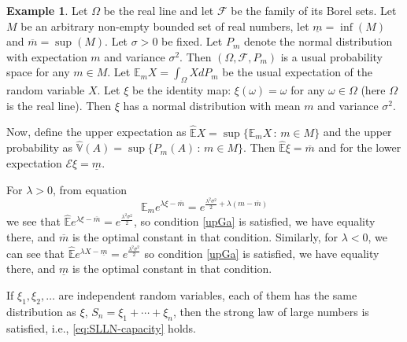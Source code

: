 \documentclass[12pt]{article}
\theoremstyle{definition}
\newtheorem{example}[theorem]{Example}
\theoremstyle{remark}
\numberwithin{equation}{section}
\def\E{{\mathbb {E}}}                       \def\D{{\mathbb {D}}}
\def\Eh{{\hat{\mathbb{E}}}}
\def\Vh{{\hat{\mathbb{V}}}}
\def\FD{{\mathcal F}}                     \def\GD{{\cal G}}
\def\ED{{\mathcal E}}
\begin{document}
\begin{example} \label{SLLNex}
Let $\Omega$ be the real line and let $\FD$ be the family of its Borel sets.
Let $M$ be an arbitrary non-empty bounded set of real numbers,
let $\underline{m}=\inf(M)$ and $\overline{m}=\sup(M)$.
Let $\sigma>0$ be fixed.
Let $P_m$ denote the normal distribution with expectation $m$ and variance $\sigma^2$.
Then $(\Omega, \FD, P_m)$ is a usual probability space for any $m\in M$.
Let $\E_m X = \int_\Omega X dP_m$ be the usual expectation of the random variable $X$.
Let $\xi$ be the identity map: $\xi(\omega) = \omega$ for any $\omega\in \Omega$ (here $\Omega$ is the real line).
Then $\xi$ has a normal distribution with mean $m$ and variance $\sigma^2$.

Now, define the upper expectation as
$\Eh X = \sup \{ \E_m X \, : \, m\in M \}$
and the upper probability as $\Vh (A) = \sup \{ P_m (A) \, : \, m\in M \}$.
Then $\Eh \xi = \overline{m}$ and for the lower expectation
$\ED \xi = \underline{m}$.

For $\lambda>0$, from equation  
$$
\E_m e^{\lambda \xi- \overline{m}} = e^{\frac{\lambda^2 \sigma^2}{2} + \lambda (m-\overline{m})} 
$$
we see that $\Eh e^{\lambda \xi- \overline{m}} = e^{\frac{\lambda^2 \sigma^2}{2}}$,
so condition  \eqref{upGa} is satisfied, we have equality there, and $\overline{m}$ is the optimal constant in that 
condition.
Similarly,
for $\lambda<0$, 
we can see that $\Eh e^{\lambda X- \underline{m}} = e^{\frac{\lambda^2 \sigma^2}{2}}$
so condition  \eqref{upGa} is satisfied, we have equality there, and $\underline{m}$ is the optimal constant in that 
condition.

If $\xi_1, \xi_2, \dots $ are independent random variables, each of them has the same distribution as $\xi$, 
$S_n= \xi_1 + \cdots + \xi_n$, then the strong law of large numbers is satisfied, i.e.,
\eqref{eq:SLLN-capacity} holds.


\end{example}
\end{document}
